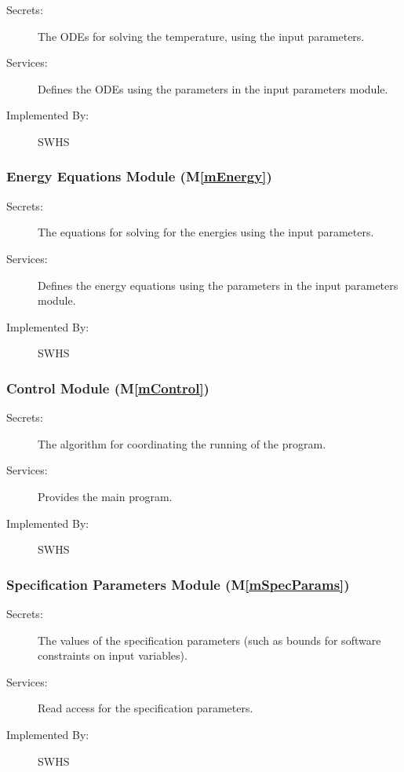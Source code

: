 \documentclass[12pt]{article}
\newcommand{\mref}[1]{M\ref{#1}}
\begin{document}
\begin{description}
\item[Secrets:] The ODEs for solving the temperature, using the input parameters.
\item[Services:] Defines the ODEs using the parameters in the input parameters module.
\item[Implemented By:] SWHS
\end{description} 

\subsubsection{Energy Equations Module (\mref{mEnergy})}

\begin{description}
\item[Secrets:] The equations for solving for the energies using the input parameters.
\item[Services:] Defines the energy equations using the parameters in the input
  parameters module.
\item[Implemented By:] SWHS
\end{description} 

\subsubsection{Control Module (\mref{mControl})}

\begin{description}
\item[Secrets:] The algorithm for coordinating the running of the program.
\item[Services:] Provides the main program.
\item[Implemented By:] SWHS
\end{description}
 
\subsubsection{Specification Parameters Module (\mref{mSpecParams})}

\begin{description}
\item[Secrets:] The values of the specification parameters (such as bounds for
  software constraints on input variables).
\item[Services:] Read access for the specification parameters.
\item[Implemented By:] SWHS
\end{description}
\end{document}
